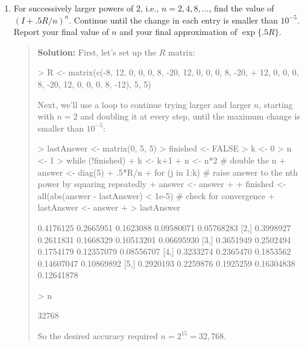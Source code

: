 \documentclass{article}
\begin{document}
\begin{enumerate}
\begin{enumerate}
    \item For successively larger powers of 2, i.e., $n=2, 4, 8, \ldots$, find
    the value of $( I + .5R/n) ^n$. Continue until the change in each entry is
    smaller than $10^{-5}$. Report your final value of $n$ and your final
    approximation of $\exp \{.5R\}$.
    \begin{quotation}{\bf Solution:}
    First, let's set up the $R$ matrix:
\begin{Schunk}
\begin{Sinput}
> R <- matrix(c(-8, 12, 0, 0, 0, 8, -20, 12, 0, 0, 0, 8, -20, 
+               12, 0, 0, 0, 8, -20, 12, 0, 0, 0, 8, -12),   5, 5)
\end{Sinput}
\end{Schunk}
    Next, we'll use a loop to continue trying larger and larger $n$,
    starting with $n=2$ and doubling it at every step,
    until the maximum change is smaller than $10^{-5}$:
\begin{Schunk}
\begin{Sinput}
> lastAnswer <- matrix(0, 5, 5)
> finished <- FALSE
> k <- 0
> n <- 1
> while (!finished) {
+   k <- k+1
+   n <- n*2 # double the n
+   answer <- diag(5) + .5*R/n 
+   for (j in 1:k) { # raise answer to the nth power by squaring repeatedly
+     answer <- answer %*% answer
+   }
+   finished <- all(abs(answer - lastAnswer) < 1e-5) # check for convergence
+   lastAnswer <- answer
+ }
> lastAnswer
\end{Sinput}
\begin{Soutput}
          [,1]      [,2]      [,3]       [,4]       [,5]
[1,] 0.4176125 0.2665951 0.1623088 0.09580071 0.05768283
[2,] 0.3998927 0.2611831 0.1668329 0.10513201 0.06695930
[3,] 0.3651949 0.2502494 0.1754179 0.12357079 0.08556707
[4,] 0.3233274 0.2365470 0.1853562 0.14607047 0.10869892
[5,] 0.2920193 0.2259876 0.1925259 0.16304838 0.12641878
\end{Soutput}
\begin{Sinput}
> n
\end{Sinput}
\begin{Soutput}
[1] 32768
\end{Soutput}
\end{Schunk}
    So the desired accuracy required $n=2^{15}= 32{,}768$.
    \end{quotation}
    

\end{enumerate}
\end{enumerate}
\end{document}
